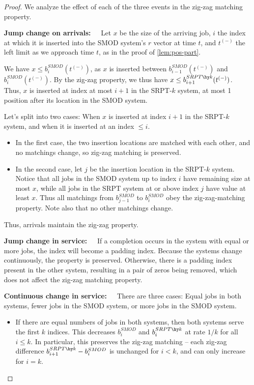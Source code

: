\documentclass[acmsmall]{acmart}
\begin{document}
\begin{proof}
We analyze the effect of each of the three events in the zig-zag matching property.

\textbf{Jump change on arrivals:~~} Let $x$ be the size of the arriving job, $i$ the index at which it is inserted into the SMOD system's $r$ vector at time $t$, and $t^{(-)}$ the left limit as we approach time $t$,
    as in the proof of \cref{lem:pos-part}.
    
    We have $x \le b^{SMOD}_i(t^{(-)})$, as $x$ is inserted between $b^{SMOD}_{i-1}(t^{(-)})$ and $b^{SMOD}_i(t^{(-)})$.
    By the zig-zag property, we thus have $x \le b^{SRPT\hy k}_{i+1}(t^{(-)})$.
    Thus, $x$ is inserted at index at most $i+1$ in the SRPT-$k$ system,
    at most 1 position after its location in the SMOD system.

    Let's split into two cases: When $x$ is inserted at index $i+1$ in the SRPT-$k$ system,
    and when it is inserted at an index $\le i$.
    \begin{itemize}
        \item In the first case, the two insertion locations are matched with each other, and no matchings change, so zig-zag matching is preserved.

        \item In the second case, let $j$ be the insertion location in the SRPT-$k$ system. Notice that all jobs in the SMOD system up to index $i$ have remaining size at most $x$, while all jobs in the SRPT system at or above index $j$ have value at least $x$. Thus all matchings from $b^{SMOD}_{j-1}$ to $b^{SMOD}_i$ obey the zig-zag-matching property. Note also that no other matchings change.
    \end{itemize}
    
    Thus, arrivals maintain the zig-zag property.

    \textbf{Jump change in service:~~} If a completion occurs in the system with equal or more jobs, the index will become a padding index. Because the systems change continuously, the property is preserved.
    Otherwise, there is a padding index present in the other system, resulting in a pair of zeros being removed, which does not affect the zig-zag matching property.

    \textbf{Continuous change in service:~~} There are three cases: Equal jobs in both systems, fewer jobs in the SMOD system, or more jobs in the SMOD system.

    \begin{itemize}
        \item If there are equal numbers of jobs in both systems, then both systems serve the first $k$ indices. This decreases $b_i^{SMOD}$ and $b_i^{SRPT\hy k}$ at rate $1/k$ for all $i \le k$. In particular, this preserves the zig-zag matching -- each zig-zag difference $b_{i+1}^{SRPT\hy k} - b_i^{SMOD}$ is unchanged for $i < k$, and can only increase for $i = k$.


\end{itemize}
\end{proof}
\end{document}
